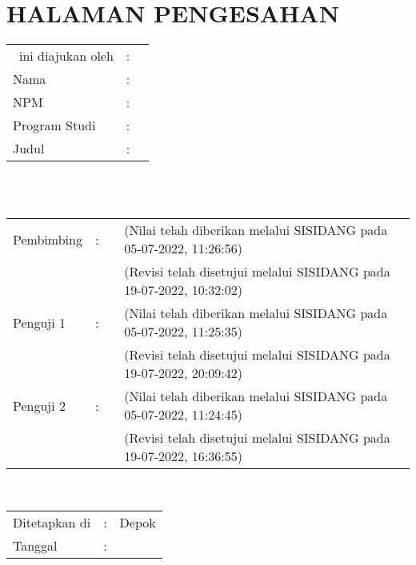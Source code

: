 %
%
%

\chapter*{HALAMAN PENGESAHAN}

\noindent

\noindent
\begin{tabular}{ll p{9cm}}
	\type~ini diajukan oleh&: & \\
	Nama&: & \penulis \\
	NPM&: & \npm \\
	Program Studi&: & \program \\
	Judul \type&: & \judul \\
\end{tabular} \\


\noindent {}\\[0.2cm]

\begin{center}
\end{center}


\begin{tabular}{l l l p{3.5cm} }
	\centering
	Pembimbing&: & \pembimbingSatu & {\scriptsize (Nilai telah diberikan melalui SISIDANG pada 05-07-2022, 11:26:56)} \\
	& & & {\scriptsize (Revisi telah disetujui melalui SISIDANG pada 19-07-2022, 10:32:02)} \\
	Penguji 1&: & \pengujiSatu & {\scriptsize (Nilai telah diberikan melalui SISIDANG pada 05-07-2022, 11:25:35)} \\
	& & & {\scriptsize (Revisi telah disetujui melalui SISIDANG pada 19-07-2022, 20:09:42)} \\
	Penguji 2&: & \pengujiDua & {\scriptsize (Nilai telah diberikan melalui SISIDANG pada 05-07-2022, 11:24:45)} \\
	& & & {\scriptsize (Revisi telah disetujui melalui SISIDANG pada 19-07-2022, 16:36:55)} \\

\end{tabular}\\


\begin{tabular}{ll l}
	Ditetapkan di&: & Depok\\
	Tanggal&: & \tanggalFinal \\
\end{tabular}


\newpage
